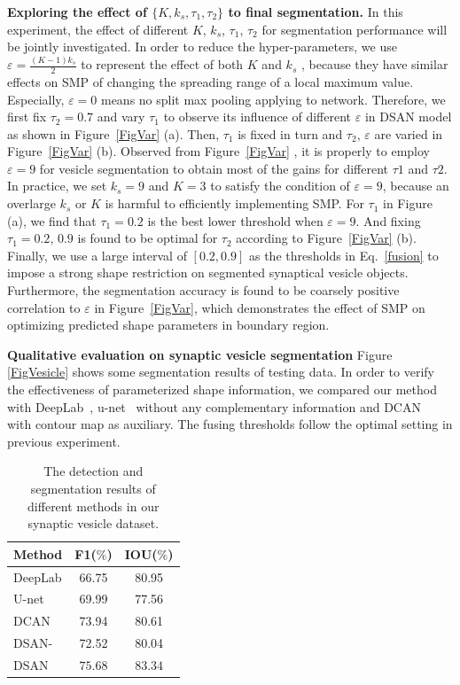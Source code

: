\noindent\textbf{Exploring the effect of $\{K, k_s, \tau_1, \tau_2\}$ to final segmentation.}
In this experiment, the effect of different $K$, $k_s$, $\tau_1$, $\tau_2$ for segmentation performance will be jointly investigated.
In order to reduce the hyper-parameters, we use $\varepsilon=\frac{(K-1)k_s}{2}$ to represent the effect of both $K$ and $k_s$ , because they have similar effects on SMP of changing the spreading range of a local maximum value.
Especially, $\varepsilon=0$ means no split max pooling applying to network.
Therefore, we first fix $\tau_2=0.7$ and vary $\tau_1$ to observe its influence of different $\varepsilon$ in DSAN model as shown in Figure~\ref{FigVar} (a).
Then, $\tau_1$ is fixed in turn and $\tau_2$, $\varepsilon$ are varied in Figure~\ref{FigVar} (b).
Observed from Figure~\ref{FigVar} , it is properly to employ $\varepsilon=9$ for vesicle segmentation to obtain most of the gains for different $\tau1$ and $\tau2$.
In practice, we set $k_s=9$ and $K=3$ to satisfy the condition of $\varepsilon=9$, because an overlarge $k_s$ or $K$ is harmful to efficiently implementing SMP.
For $\tau_1$ in Figure~ (a), we find that $\tau_1=0.2$ is the best lower threshold when $\varepsilon=9$.
And fixing $\tau_1=0.2$, $0.9$ is found to be optimal for $\tau_2$ according to Figure~\ref{FigVar} (b).
Finally, we use a large interval of $[0.2, 0.9]$ as the thresholds in Eq.~\ref{fusion} to impose a strong shape restriction on segmented synaptical vesicle objects.
Furthermore, the segmentation accuracy is found to be coarsely positive correlation to $\varepsilon$ in Figure~\ref{FigVar}, which demonstrates the effect of SMP on optimizing predicted shape parameters in boundary region.


\noindent\textbf{Qualitative evaluation on synaptic vesicle segmentation}
Figure \ref{FigVesicle} shows some segmentation results of testing data.
In order to verify the effectiveness of parameterized shape information, we compared our method with DeepLab~\cite{Chen2014a}, u-net~\cite{Ronneberger2015} without any complementary information and DCAN~\cite{Chen2016a} with contour map as auxiliary.
The fusing thresholds follow the optimal setting in previous experiment.

\begin{table}
\begin{center}
\begin{tabular}{lcc}
\hline
Method & F1($\%$) & IOU($\%$) \\
\hline
DeepLab & 66.75 & 80.95 \\
U-net & 69.99 & 77.56 \\
DCAN & 73.94 & 80.61 \\
DSAN- & 72.52 & 80.04 \\
DSAN & $\mathbf{75.68}$ & $\mathbf{83.34}$\\
\hline
\end{tabular}
\end{center}
\caption{The detection and segmentation results of different methods in our synaptic vesicle dataset.}
\label{tab:vesicle}
\end{table}


